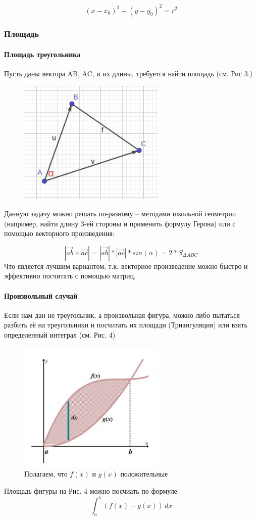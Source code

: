 \[
    (x - x_0)^2 + (y - y_0)^2 = r^2
\]

\subsubsection{Площадь}

\paragraph*{Площадь треугольника} Пусть даны вектора AB, AC, и их длины, требуется найти площадь (см. Рис 3.)

\begin{figure}[H]
    \centering
    \includegraphics[width = 7cm]{Triangle.jpeg}
    \caption{}
    \label{fig:float}
\end{figure}

Данную задачу можно решать по-разному -- методами школьной геометрии (например, найти длину 3-ей стороны и применить формулу Герона) или с помощью векторного произведения:

\[
    |\vec{ab} \times \vec{ac}| = |\vec{ab}| * |\vec{ac}| * sin(\alpha) = 2 * S_{\Delta ABC}
\]
Что является лучшим вариантом, т.к. векторное произведение можно быстро и эффективно посчитать с помощью матриц.

\paragraph*{Произвольный случай} Если нам дан не треугольник, а произвольная фигура, можно либо пытаться разбить её на треугольники и посчитать их площади (Триангуляция) или взять определенный интеграл (см. Рис. 4)

\begin{figure}[H]
    \centering
    \includegraphics[width = 7cm]{integral.jpeg}
    \caption{Полагаем, что $f(x)$ и $g(x)$ положительные}
    \label{fig:float}
\end{figure}
Площадь фигуры на Рис. 4 можно посчиать по формуле
\[
    \int_a^b (f(x) - g(x)) \, dx
\]

